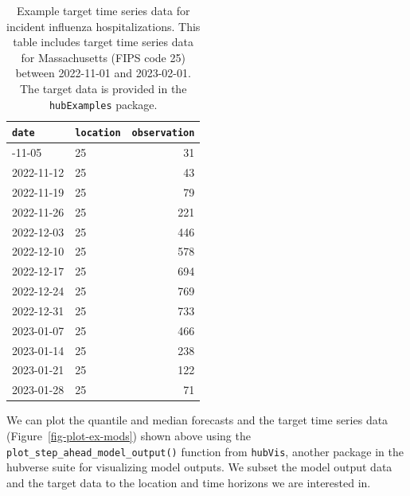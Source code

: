 \documentclass[
]{article}
\begin{document}
\begin{longtable}[]{@{}llr@{}}

\caption{\label{tbl-example-target-time-series-data}Example target time
series data for incident influenza hospitalizations. This table includes
target time series data for Massachusetts (FIPS code 25) between
2022-11-01 and 2023-02-01. The target data is provided in the
\texttt{hubExamples} package.}

\tabularnewline

\toprule\noalign{}
\texttt{date} & \texttt{location} & \texttt{observation} \\
\midrule\noalign{}
\endhead
\bottomrule\noalign{}
\endlastfoot
2022-11-05 & 25 & 31 \\
2022-11-12 & 25 & 43 \\
2022-11-19 & 25 & 79 \\
2022-11-26 & 25 & 221 \\
2022-12-03 & 25 & 446 \\
2022-12-10 & 25 & 578 \\
2022-12-17 & 25 & 694 \\
2022-12-24 & 25 & 769 \\
2022-12-31 & 25 & 733 \\
2023-01-07 & 25 & 466 \\
2023-01-14 & 25 & 238 \\
2023-01-21 & 25 & 122 \\
2023-01-28 & 25 & 71 \\

\end{longtable}

We can plot the quantile and median forecasts and the target time series
data (Figure~\ref{fig-plot-ex-mods}) shown above using the
\texttt{plot\_step\_ahead\_model\_output()} function from
\texttt{hubVis}, another package in the hubverse suite for visualizing
model outputs. We subset the model output data and the target data to
the location and time horizons we are interested in.
\end{document}
